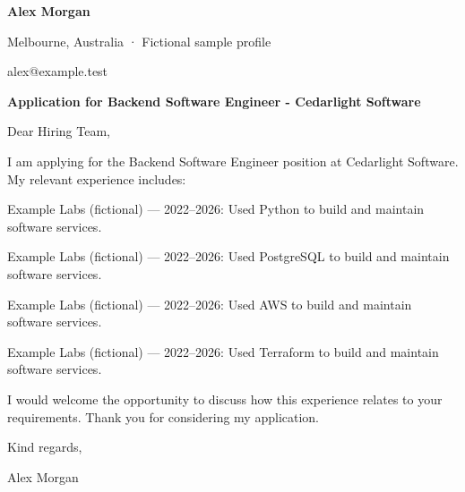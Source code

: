 \documentclass[10pt,a4paper]{article}
\begin{document}
{\LARGE\bfseries\color{navy} Alex Morgan}\par
Melbourne, Australia · Fictional sample profile\par
alex@example.test\par
{\large\bfseries\color{navy} Application for Backend Software Engineer - Cedarlight Software}\par
Dear Hiring Team,\par
I am applying for the Backend Software Engineer position at Cedarlight Software. My relevant experience includes:\par
Example Labs (fictional) — 2022–2026: Used Python to build and maintain software services.\par
Example Labs (fictional) — 2022–2026: Used PostgreSQL to build and maintain software services.\par
Example Labs (fictional) — 2022–2026: Used AWS to build and maintain software services.\par
Example Labs (fictional) — 2022–2026: Used Terraform to build and maintain software services.\par
I would welcome the opportunity to discuss how this experience relates to your requirements. Thank you for considering my application.\par
Kind regards,\par
Alex Morgan\par
\end{document}
